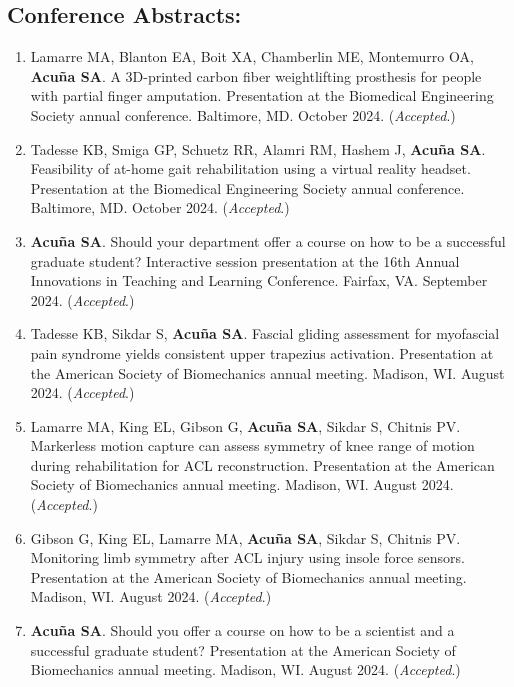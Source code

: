 \documentclass[letterpaper, 10pt]{article}
\begin{document}
\subsection{Conference Abstracts:} %
\begin{enumerate}
    \item Lamarre MA, Blanton EA, Boit XA, Chamberlin ME, Montemurro OA, \textbf{Acuña SA}. A 3D-printed carbon fiber weightlifting prosthesis for people with partial finger amputation. Presentation at the Biomedical Engineering Society annual conference. Baltimore, MD. October 2024. (\textit{Accepted}.)
    \item Tadesse KB, Smiga GP, Schuetz RR, Alamri RM, Hashem J, \textbf{Acuña SA}. Feasibility of at-home gait rehabilitation using a virtual reality headset. Presentation at the Biomedical Engineering Society annual conference. Baltimore, MD. October 2024. (\textit{Accepted}.)
    \item \textbf{Acuña SA}. Should your department offer a course on how to be a successful graduate student? Interactive session presentation at the 16th Annual Innovations in Teaching and Learning Conference. Fairfax, VA. September 2024. (\textit{Accepted}.)
    \item Tadesse KB, Sikdar S, \textbf{Acuña SA}. Fascial gliding assessment for myofascial pain syndrome yields consistent upper trapezius activation. Presentation at the American Society of Biomechanics annual meeting. Madison, WI. August 2024. (\textit{Accepted}.)
    \item Lamarre MA, King EL, Gibson G, \textbf{Acuña SA}, Sikdar S, Chitnis PV. Markerless motion capture can assess symmetry of knee range of motion during rehabilitation for ACL reconstruction. Presentation at the American Society of Biomechanics annual meeting. Madison, WI. August 2024. (\textit{Accepted}.)
    \item Gibson G, King EL, Lamarre MA, \textbf{Acuña SA}, Sikdar S, Chitnis PV. Monitoring limb symmetry after ACL injury using insole force sensors. Presentation at the American Society of Biomechanics annual meeting. Madison, WI. August 2024. (\textit{Accepted}.)   
    \item \textbf{Acuña SA}. Should you offer a course on how to be a scientist and a successful graduate student? Presentation at the American Society of Biomechanics annual meeting. Madison, WI. August 2024. (\textit{Accepted}.)

\end{enumerate}
\end{document}
